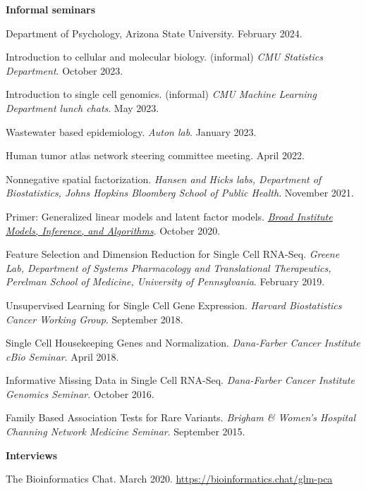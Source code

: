 \documentclass[10pt]{article}
\begin{document}
\textbf{Informal seminars}
\begin{enumerate}[label= {[\arabic*]}]
\item Department of Psychology, Arizona State University. February 2024.
\item Introduction to cellular and molecular biology. (informal) {\it CMU Statistics Department}. October 2023.
\item Introduction to single cell genomics. (informal) {\it CMU Machine Learning Department lunch chats}. May 2023.
\item Wastewater based epidemiology. {\it Auton lab}. January 2023.
\item Human tumor atlas network steering committee meeting. April 2022.
\item Nonnegative spatial factorization. {\it Hansen and Hicks labs, Department of Biostatistics, Johns Hopkins Bloomberg School of Public Health}. November 2021.
\item Primer: Generalized linear models and latent factor models. \href{https://www.broadinstitute.org/talks/primer-generalized-linear-models-and-latent-factor-models}{{\it Broad Institute Models, Inference, and Algorithms}}. October 2020.
\item Feature Selection and Dimension Reduction for Single Cell RNA-Seq. {\it Greene Lab, Department of Systems Pharmacology and Translational Therapeutics, Perelman School of Medicine, University of Pennsylvania}. February 2019.
\item Unsupervised Learning for Single Cell Gene Expression. {\it Harvard Biostatistics Cancer Working Group}. September 2018.
\item Single Cell Housekeeping Genes and Normalization. {\it Dana-Farber Cancer Institute cBio Seminar}. April 2018.
\item Informative Missing Data in Single Cell RNA-Seq. {\it Dana-Farber Cancer Institute Genomics Seminar}. October 2016.
\item Family Based Association Tests for Rare Variants. {\it Brigham \& Women's Hospital Channing Network Medicine Seminar}. September 2015.
\end{enumerate}

\textbf{Interviews}
\begin{enumerate}[label={[\arabic*]}]
\item The Bioinformatics Chat. March 2020. \url{https://bioinformatics.chat/glm-pca}
\end{enumerate}
\end{document}
